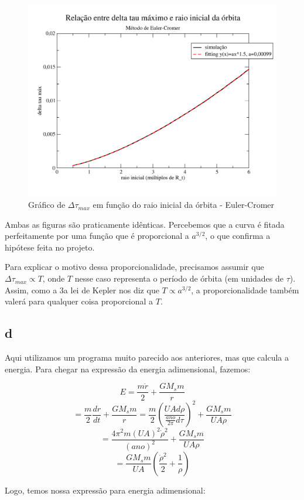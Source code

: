 \documentclass[12pt,a4paper]{article}
\begin{document}
\begin{figure}[H]
\includegraphics[width=\linewidth]{../tarefa-1c/grafico_dtaumax_ec.png}
\caption{Gráfico de $\Delta\tau_{max}$ em função do raio inicial da órbita - Euler-Cromer}
\end{figure}

Ambas as figuras são praticamente idênticas. Percebemos que a curva é fitada perfeitamente por uma função que é proporcional a $a^{3/2}$, o que confirma a hipótese feita no projeto.

Para explicar o motivo dessa proporcionalidade, precisamos assumir que $\Delta\tau_{max} \propto T$, onde $T$ nesse caso representa o período de órbita (em unidades de $\tau$). Assim, como a 3a lei de Kepler nos diz que $T \propto a^{3/2}$, a proporcionalidade também valerá para qualquer coisa proporcional a $T$.

\subsection{d}
Aqui utilizamos um programa muito parecido aos anteriores, mas que calcula a energia. Para chegar na expressão da energia adimensional, fazemos:

\[ E = \frac{m\dot{r}}{2} + \frac{GM_sm}{r} \]
\[ = \frac{m}{2}\frac{dr}{dt} + \frac{GM_sm}{r} 
= \frac{m}{2}\left( \frac{UAd\rho}{\frac{ano}{2\pi}d\tau}\right) ^2 + \frac{GM_sm}{UA\rho}
\]
\[ = \frac{4\pi^2m(UA)^2\dot{\rho}^2}{(ano)^2} + \frac{GM_sm}{UA\rho} \]
\[ = \frac{GM_sm}{UA}\left( \frac{\dot{\rho}^2}{2} + \frac{1}{\rho} \right)  \]

Logo, temos nossa expressão para energia adimensional:
\end{document}

